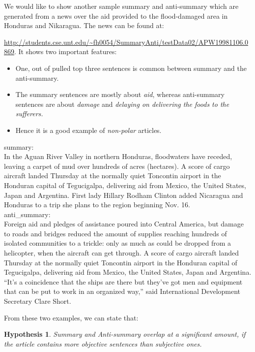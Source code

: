 \documentclass[a4paper]{report}
\newtheorem{hyp}{Hypothesis}
\begin{document}
\par We would like to show another sample summary and anti-summary which are generated from a news over the aid provided to the flood-damaged area in Honduras and Nikaragua. The news can be found at: {\url{http://students.cse.unt.edu/~fh0054/SummaryAnti/testData02/APW19981106.0869}. It shows two important features:

\begin{itemize}
\item One, out of pulled top three sentences is common between summary and the anti-summary.
\item The summary sentences are mostly about {\em aid}, whereas anti-summary sentences are about {\em damage} and {\em delaying on delivering the foods to the sufferers.} 
\item Hence it is a good example of \emph{non-polar} articles.
\end{itemize}

 \vspace{-0.1in}%
\begin{mdframed}[style=MyFrame]
summary: \\
In the Aguan River Valley in northern Honduras, floodwaters have receded, leaving a carpet of mud over hundreds of acres (hectares). A score of cargo aircraft landed Thursday at the normally quiet Toncontin airport in the Honduran capital of Tegucigalpa, delivering aid from Mexico, the United States, Japan and Argentina. First lady Hillary Rodham Clinton added Nicaragua and Honduras to a trip she plans to the region beginning Nov. 16.\\
anti\_summary: \\
Foreign aid and pledges of assistance poured into Central America, but damage to roads and bridges reduced the amount of supplies reaching hundreds of isolated communities to a trickle: only as much as could be dropped from a helicopter, when the aircraft can get through. A score of cargo aircraft landed Thursday at the normally quiet Toncontin airport in the Honduran capital of Tegucigalpa, delivering aid from Mexico, the United States, Japan and Argentina. ``It's a coincidence that the ships are there but they've got men and equipment that can be put to work in an organized way,'' said International Development Secretary Clare Short. 
\end{mdframed}
From these two examples, we can state that: 
\begin{hyp} 
\label{h3}
Summary and Anti-summary {\em overlap} at a significant amount, if the article contains more {\em objective} sentences than {\em subjective} ones.
\end{hyp}

}
\end{document}
